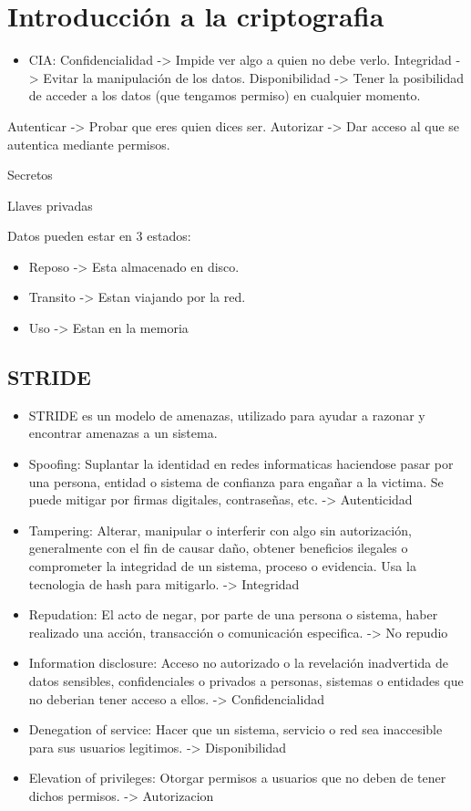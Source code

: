 \documentclass[11pt]{article}
\begin{document}
\section{Introducción a la criptografia}
\label{sec:orgc463e78}
\begin{itemize}
\item CIA:
Confidencialidad -> Impide ver algo a quien no debe verlo.
Integridad -> Evitar la manipulación de los datos.
Disponibilidad -> Tener la posibilidad de acceder a los datos (que tengamos permiso) en cualquier momento.
\end{itemize}

Autenticar -> Probar que eres quien dices ser.
Autorizar -> Dar acceso al que se autentica mediante permisos.

Secretos

Llaves privadas

Datos pueden estar en 3 estados:
\begin{itemize}
\item Reposo -> Esta almacenado en disco.
\item Transito -> Estan viajando por la red.
\item Uso -> Estan en la memoria
\end{itemize}
\subsection{STRIDE}
\label{sec:org0228619}
\begin{itemize}
\item STRIDE es un modelo de amenazas, utilizado para ayudar a razonar y encontrar amenazas a un sistema.

\item Spoofing: Suplantar la identidad en redes informaticas haciendose pasar por una persona, entidad o sistema de confianza para engañar a la victima. Se puede mitigar por firmas digitales, contraseñas, etc. -> Autenticidad

\item Tampering: Alterar, manipular o interferir con algo sin autorización, generalmente con el fin de causar daño, obtener beneficios ilegales o comprometer la integridad de un sistema, proceso o evidencia. Usa la tecnologia de hash para mitigarlo. -> Integridad

\item Repudation: El acto de negar, por parte de una persona o sistema, haber realizado una acción, transacción o comunicación especifica. -> No repudio

\item Information disclosure: Acceso no autorizado o la revelación inadvertida de datos sensibles, confidenciales o privados a personas, sistemas o entidades que no deberian tener acceso a ellos. -> Confidencialidad

\item Denegation of service: Hacer que un sistema, servicio o red sea inaccesible para sus usuarios legitimos. -> Disponibilidad

\item Elevation of privileges: Otorgar permisos a usuarios que no deben de tener dichos permisos. -> Autorizacion
\end{itemize}
\end{document}
